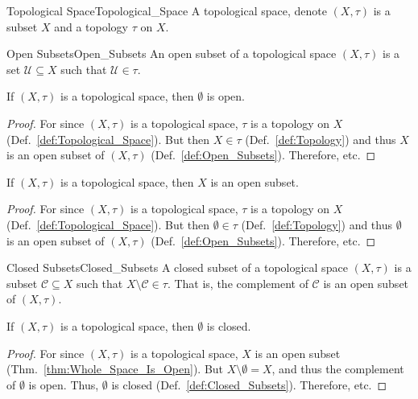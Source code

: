     \begin{ldefinition}{Topological Space}{Topological_Space}
        A topological space, denote $(X,\tau)$ is a subset $X$ and a topology
        $\tau$ on $X$.
    \end{ldefinition}
    \begin{ldefinition}{Open Subsets}{Open_Subsets}
        An open subset of a topological space $(X,\tau)$ is a set
        $\mathcal{U}\subseteq{X}$ such that $\mathcal{U}\in\tau$.
    \end{ldefinition}
    \begin{theorem}
        \label{thm:Emptyset_Is_Open}%
        If $(X,\tau)$ is a topological space, then $\emptyset$ is open.
    \end{theorem}
    \begin{proof}
        For since $(X,\tau)$ is a topological space, $\tau$ is a topology on $X$
        (Def.~\ref{def:Topological_Space}). But then
        $X\in\tau$ (Def.~\ref{def:Topology}) and thus $X$ is an open subset of
        $(X,\tau)$ (Def.~\ref{def:Open_Subsets}). Therefore, etc.
    \end{proof}
    \begin{theorem}
        \label{thm:Whole_Space_Is_Open}%
        If $(X,\tau)$ is a topological space, then $X$ is an open subset.
    \end{theorem}
    \begin{proof}
        For since $(X,\tau)$ is a topological space, $\tau$ is a topology on $X$
        (Def.~\ref{def:Topological_Space}). But then $\emptyset\in\tau$
        (Def.~\ref{def:Topology}) and thus $\emptyset$ is an open subset of
        $(X,\tau)$ (Def.~\ref{def:Open_Subsets}). Therefore, etc.
    \end{proof}
    \begin{ldefinition}{Closed Subsets}{Closed_Subsets}
        A closed subset of a topological space $(X,\tau)$ is a subset
        $\mathcal{C}\subseteq{X}$ such that $X\setminus\mathcal{C}\in\tau$.
        That is, the complement of $\mathcal{C}$ is an open subset of
        $(X,\tau)$.
    \end{ldefinition}
    \begin{theorem}
        \label{thm:Emptyset_Is_Closed}%
        If $(X,\tau)$ is a topological space, then $\emptyset$ is closed.
    \end{theorem}
    \begin{proof}
        For since $(X,\tau)$ is a topological space, $X$ is an open subset
        (Thm.~\ref{thm:Whole_Space_Is_Open}). But $X\setminus\emptyset=X$, and
        thus the complement of $\emptyset$ is open. Thus, $\emptyset$ is closed
        (Def.~\ref{def:Closed_Subsets}). Therefore, etc.
    \end{proof}
